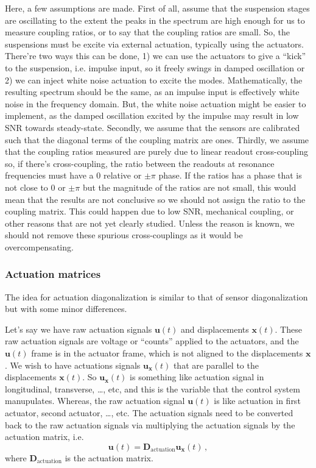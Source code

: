 Here, a few assumptions are made.
First of all, assume that the suspension stages are oscillating to the extent the peaks in the spectrum are high enough for us to measure coupling ratios, or to say that the coupling ratios are small.
So, the suspensions must be excite via external actuation, typically using the actuators.
There're two ways this can be done, 1) we can use the actuators to give a ``kick'' to the suspension, i.e. impulse input, so it freely swings in damped oscillation or 2) we can inject white noise actuation to excite the modes.
Mathematically, the resulting spectrum should be the same, as an impulse input is effectively white noise in the frequency domain.
But, the white noise actuation might be easier to implement, as the damped oscillation excited by the impulse may result in low SNR towards steady-state.
Secondly, we assume that the sensors are calibrated such that the diagonal terms of the coupling matrix are ones.
Thirdly, we assume that the coupling ratios measured are purely due to linear readout cross-coupling so, if there's cross-coupling, the ratio between the readouts at resonance frequencies must have a 0 relative or $\pm \pi$ phase.
If the ratios has a phase that is not close to 0 or $\pm \pi$ but the magnitude of the ratios are not small, this would mean that the results are not conclusive so we should not assign the ratio to the coupling matrix.
This could happen due to low SNR, mechanical coupling, or other reasons that are not yet clearly studied.
Unless the reason is known, we should not remove these spurious cross-couplings as it would be overcompensating.

\subsubsection{Actuation matrices \label{sec:control_matrices_actuation_matrices}}
The idea for actuation diagonalization is similar to that of sensor diagonalization but with some minor differences.

Let's say we have raw actuation signals $\mathbf{u}(t)$ and displacements $\mathbf{x}(t)$.
These raw actuation signals are voltage or ``counts'' applied to the actuators, and the $\mathbf{u}(t)$ frame is in the actuator frame, which is not aligned to the displacements $\mathbf{x}$.
We wish to have actuations signals $\mathbf{u}_\mathbf{x}(t)$ that are parallel to the displacements $\mathbf{x}(t)$.
So $\mathbf{u}_\mathbf{x}(t)$ is something like actuation signal in longitudinal, transverse, \dots, etc, and this is the variable that the control system manupulates.
Whereas, the raw actuation signal $\mathbf{u}(t)$ is like actuation in first actuator, second actuator, \dots, etc.
The actuation signals need to be converted back to the raw actuation signals via multiplying the actuation signals by the actuation matrix, i.e.
\begin{equation}
	\mathbf{u}(t)=\mathbf{D}_\mathrm{actuation}\mathbf{u}_\mathbf{x}(t)\,,
\end{equation}
where $\mathbf{D}_\mathrm{actuation}$ is the actuation matrix.


